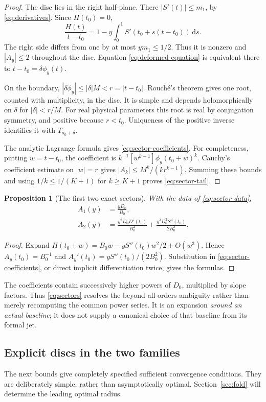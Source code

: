 \documentclass[11pt,a4paper]{article}
\numberwithin{equation}{section}
\newtheorem{proposition}[theorem]{Proposition}
\theoremstyle{definition}
\theoremstyle{remark}
\newcommand{\dd}{\,\mathrm d}
\begin{document}
\begin{proof}
The disc lies in the right half-plane. There \(|S'(t)|\le m_1\), by
\eqref{eq:derivatives}. Since \(H(t_0)=0\),
\[
 \frac{H(t)}{t-t_0}
 =1-y\int_0^1 S'(t_0+s(t-t_0))\dd s.
\]
The right side differs from one by at most \(ym_1\le1/2\). Thus it is
nonzero and \(|A_y|\le2\) throughout the disc. Equation
\eqref{eq:deformed-equation} is equivalent there to
\(t-t_0=\delta\phi_y(t)\).

On the boundary, \(|\delta\phi_y|\le|\delta|M<r=|t-t_0|\).
Rouch\'e's theorem gives one root, counted with multiplicity, in the
disc. It is simple and depends holomorphically on \(\delta\) for
\(|\delta|<r/M\). For real physical parameters this root is real by
conjugation symmetry, and positive because \(r<t_0\). Uniqueness of
the positive inverse identifies it with \(T_{a_0+\delta}\).

The analytic Lagrange formula gives \eqref{eq:sector-coefficients}.
For completeness, putting \(w=t-t_0\), the coefficient is
\(k^{-1}[w^{k-1}]\phi_y(t_0+w)^k\).
Cauchy's coefficient estimate on \(|w|=r\) gives
\(|A_k|\le M^k/(kr^{k-1})\). Summing these bounds and using
\(1/k\le1/(K+1)\) for \(k\ge K+1\) proves
\eqref{eq:sector-tail}.
\end{proof}

\begin{proposition}[The first two exact sectors]
\label{prop:first-sectors}
With the data of \eqref{eq:sector-data},
\begin{align}
 A_1(y)&=\frac{yD_0}{B_0},\label{eq:a1}\\
 A_2(y)&=\frac{y^2D_0D'(t_0)}{B_0^2}
       +\frac{y^3D_0^2S''(t_0)}{2B_0^3}.\label{eq:a2}
\end{align}
\end{proposition}
\begin{proof}
Expand \(H(t_0+w)=B_0w-yS''(t_0)w^2/2+O(w^3)\). Hence
\(A_y(t_0)=B_0^{-1}\) and
\(A_y'(t_0)=yS''(t_0)/(2B_0^2)\).
Substitution in \eqref{eq:sector-coefficients}, or direct implicit
differentiation twice, gives the formulas.
\end{proof}

The coefficients contain successively higher powers of \(D_0\),
multiplied by slope factors. Thus \eqref{eq:sectors} resolves the
beyond-all-orders ambiguity rather than merely recomputing the common
power series. It is an expansion \emph{around an actual baseline}; it
does not supply a canonical choice of that baseline from its formal jet.

\subsection{Explicit discs in the two families}
The next bounds give completely specified sufficient convergence
conditions. They are deliberately simple, rather than asymptotically
optimal. Section~\ref{sec:fold} will determine the leading optimal
radius.
\end{document}
